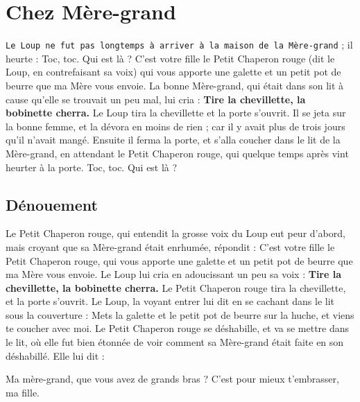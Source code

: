 \documentclass[a4paper,11pt]{article}
\begin{document}
\section{Chez Mère-grand}
\texttt{Le Loup ne fut pas longtemps à arriver à la maison de la Mère-grand} ; il heurte :
Toc, toc. Qui est là ? C'est votre fille le Petit Chaperon rouge (dit le Loup, en contrefaisant sa voix) qui vous apporte une galette et un petit pot de beurre que ma Mère vous envoie. La bonne Mère-grand, qui était dans son lit à cause qu'elle se trouvait un peu mal, lui cria : \textbf{Tire la chevillette, la bobinette cherra.}
Le Loup tira la chevillette et la porte s'ouvrit. Il se jeta sur la bonne femme, et la dévora en moins de rien ; car il y avait plus de trois jours qu'il n'avait mangé. Ensuite il ferma la porte, et s'alla coucher dans le lit de la Mère-grand, en attendant le Petit Chaperon rouge, qui quelque temps après vint heurter à la porte. Toc, toc. Qui est là ?

\subsection{Dénouement}
Le Petit Chaperon rouge, qui entendit la grosse voix du Loup eut peur d'abord, mais croyant que sa Mère-grand était enrhumée, répondit : C'est votre fille le Petit Chaperon rouge, qui vous apporte une galette et un petit pot de beurre que ma Mère vous envoie. Le Loup lui cria en adoucissant un peu sa voix : \textbf{Tire la chevillette, la bobinette cherra.} Le Petit Chaperon rouge tira la chevillette, et la porte s'ouvrit. Le Loup, la voyant entrer lui dit en se cachant dans le lit sous la couverture : Mets la galette et le petit pot de beurre sur la huche, et viens te coucher avec moi. Le Petit Chaperon rouge se déshabille, et va se mettre dans le lit, où elle fut bien étonnée de voir comment sa Mère-grand était faite en son déshabillé. Elle lui dit :

\bigskip\label{espaces}
\noindent Ma mère-grand, que vous avez de grands bras ? C'est pour mieux t'embrasser, ma fille.

\bigskip
{}

\bigskip
{}

\bigskip
{}
\end{document}
